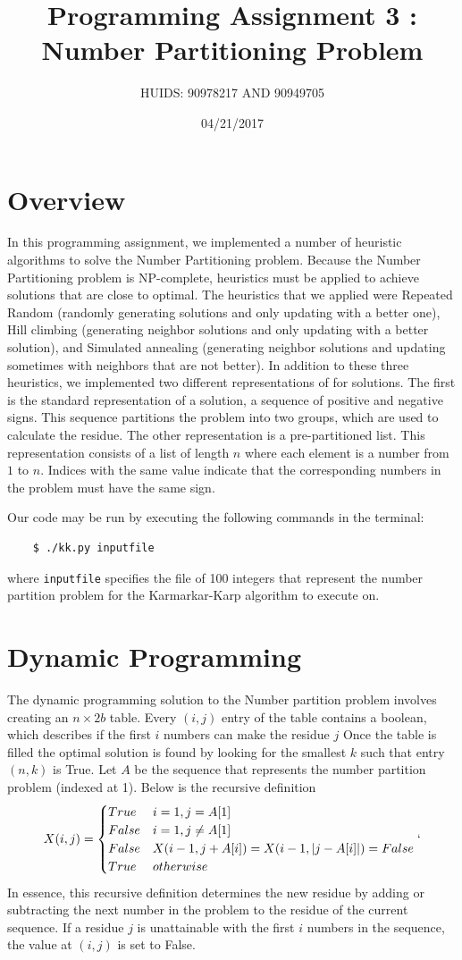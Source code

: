 \documentclass[a4paper]{article}
\title{Programming Assignment 3 : Number Partitioning Problem}
\author{HUIDS: 90978217 AND 90949705}
\date{04/21/2017}
\begin{document}
	
	\maketitle
	
	\section{Overview}
	In this programming assignment, we implemented a number of heuristic algorithms to solve the Number Partitioning problem. Because the Number Partitioning problem is NP-complete, heuristics must be applied to achieve solutions that are close to optimal. The heuristics that we applied were Repeated Random (randomly generating solutions and only updating with a better one), Hill climbing (generating neighbor solutions and only updating with a better solution), and Simulated annealing (generating neighbor solutions and updating sometimes with neighbors that are not better). In addition to these three heuristics, we implemented two different representations of for solutions. The first is the standard representation of a solution, a sequence of positive and negative signs. This sequence partitions the problem into two groups, which are used to calculate the residue. The other representation is a pre-partitioned list. This representation consists of a list of length $n$ where each element is a number from $1$ to $n$. Indices with the same value indicate that the corresponding numbers in the problem must have the same sign.
	
	Our code may be run by executing the following commands in the terminal:
	\begin{verbatim}
	$ ./kk.py inputfile
	\end{verbatim}
	where \texttt{inputfile} specifies the file of 100 integers that represent the number partition problem for the Karmarkar-Karp algorithm to execute on.
	
	\section{Dynamic Programming}
	The dynamic programming solution to the Number partition problem involves creating an $n \times 2b$ table. Every $(i,j)$ entry of the table contains a boolean, which describes if the first $i$ numbers can make the residue $j$  Once the table is filled the optimal solution is found by looking for the smallest $k$ such that entry $(n,k)$ is True. Let $A$ be the sequence that represents the number partition problem (indexed at 1). Below is the recursive definition
	\[X(i,j) = 
	\begin{cases}
	True & i = 1, j = A[1]\\
	False & i = 1, j \neq A[1] \\ 
	False & X(i-1, j + A[i]) = X(i-1, |j - A[i]|) = False \\
	True & otherwise
	\end{cases}`
	\]
	In essence, this recursive definition determines the new residue by adding or subtracting the next number in the problem to the residue of the current sequence. If a residue $j$ is unattainable with the first $i$ numbers in the sequence, the value at $(i,j)$ is set to False. 
	
\end{document}
